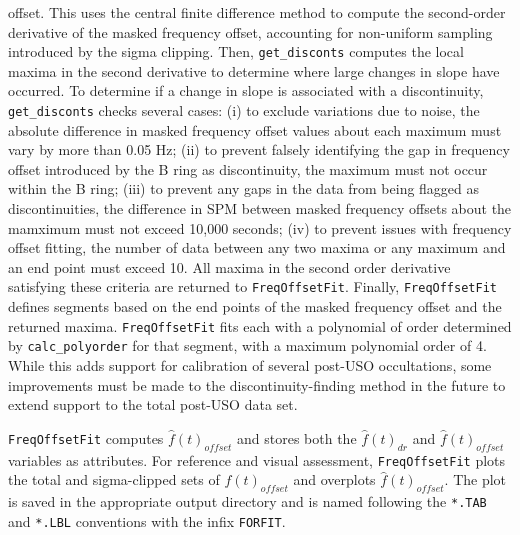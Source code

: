 \documentclass[titlepage, 12pt]{article}
\begin{document}
                offset. This uses the central finite difference method to compute the
                second-order derivative of the masked frequency offset, accounting for
                non-uniform sampling introduced by the sigma clipping. Then,
                \texttt{get\_disconts} computes the local maxima in the second derivative
                to determine where large changes in slope have occurred. To determine if a
                change in slope is associated with a discontinuity, \texttt{get\_disconts}
                checks several cases: (i) to exclude variations due to noise, the absolute
                difference in masked frequency offset values about each maximum must vary
                by more than 0.05 Hz; (ii) to prevent falsely identifying the gap in
                frequency offset introduced by the B ring as discontinuity, the maximum
                must not occur within the B ring; (iii) to prevent any gaps in the data
                from being flagged as discontinuities, the difference in SPM between masked
                frequency offsets about the mamximum must not exceed 10,000 seconds; (iv)
                to prevent issues with frequency offset fitting, the number of data between
                any two maxima or any maximum and an end point must exceed 10. All maxima
                in the second order derivative satisfying these criteria are returned to 
                \texttt{FreqOffsetFit}. Finally, \texttt{FreqOffsetFit} defines segments based on the end points of the masked frequency offset and the returned maxima. \texttt{FreqOffsetFit} fits each with a polynomial of order determined by \texttt{calc\_polyorder} for that segment, with a maximum polynomial order of 4. While this adds support for calibration of several post-USO occultations, some improvements must be made to the discontinuity-finding method in the future to extend support to the total post-USO data set.
                \par\hfill\par
                \texttt{FreqOffsetFit}
                computes $\hat{f}(t)_{offset}$ and stores both the
                $\hat{f}(t)_{dr}$ and $\hat{f}(t)_{offset}$
                variables as attributes.
                For reference and visual assessment, \texttt{FreqOffsetFit}
                plots the total and sigma-clipped sets of $f(t)_{offset}$ and
                overplots $\hat{f}(t)_{offset}$. The plot is saved in the
                appropriate output directory and is named following the
                \texttt{*.TAB} and \texttt{*.LBL} conventions with the infix
                \texttt{FORFIT}.
\end{document}
